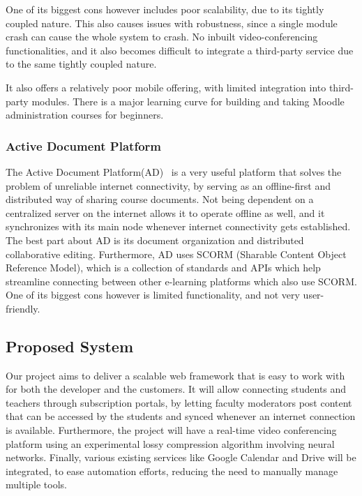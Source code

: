 One of its biggest cons however includes poor scalability, due to its tightly coupled nature. 
This also causes issues with robustness, since a single module crash can cause the whole system to crash. 
No inbuilt video-conferencing functionalities, and it also becomes difficult to integrate a 
third-party service due to the same tightly coupled nature.

It also offers a relatively poor mobile offering, with limited integration into third-party modules. 
There is a major learning curve for building and taking Moodle administration courses for beginners.

\subsubsection{Active Document Platform}
The Active Document Platform(AD)~\cite{ActiveDocument} is a very useful platform that 
solves the problem of unreliable internet connectivity, by serving as an offline-first 
and distributed way of sharing course documents. Not being dependent on a centralized server on the internet allows it to operate offline as well, and it synchronizes with its main node whenever internet connectivity gets established. The best part about AD 
is its document organization and distributed collaborative editing. Furthermore, AD 
uses SCORM (Sharable Content Object Reference Model), which is a collection of standards and APIs which help streamline connecting between other e-learning platforms which also use SCORM. One of its biggest cons however is limited functionality, and not very user-friendly.

\subsection{Proposed System}

Our project aims to deliver a scalable web framework that is easy to work with for both the developer and the customers. It will allow connecting students and teachers 
through subscription portals, by letting faculty moderators post content that can be accessed 
by the students and synced whenever an internet connection is available. 
Furthermore, the project will have a real-time video conferencing platform using an experimental lossy compression algorithm involving neural networks. 
Finally, various existing services like Google Calendar and Drive will be integrated, to ease automation efforts, reducing the need to manually manage multiple tools.

